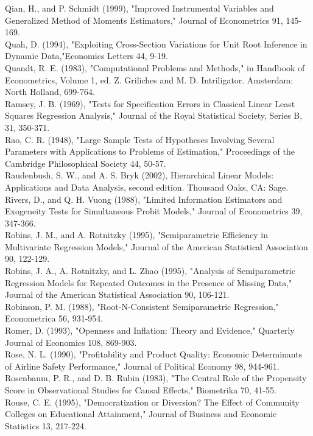\documentclass[10pt]{article}
\begin{document}
Qian, H., and P. Schmidt (1999), "Improved Instrumental Variables and Generalized Method of Moments Estimators," Journal of Econometrics 91, 145-169.\\
Quah, D. (1994), "Exploiting Cross-Section Variations for Unit Root Inference in Dynamic Data,"Economics Letters 44, 9-19.\\
Quandt, R. E. (1983), "Computational Problems and Methods," in Handbook of Econometrics, Volume 1, ed. Z. Griliches and M. D. Intriligator. Amsterdam: North Holland, 699-764.\\
Ramsey, J. B. (1969), "Tests for Specification Errors in Classical Linear Least Squares Regression Analysis," Journal of the Royal Statistical Society, Series B, 31, 350-371.\\
Rao, C. R. (1948), "Large Sample Tests of Hypotheses Involving Several Parameters with Applications to Problems of Estimation," Proceedings of the Cambridge Philosophical Society 44, 50-57.\\
Raudenbush, S. W., and A. S. Bryk (2002), Hierarchical Linear Models: Applications and Data Analysis, second edition. Thousand Oaks, CA: Sage.\\
Rivers, D., and Q. H. Vuong (1988), "Limited Information Estimators and Exogeneity Tests for Simultaneous Probit Models," Journal of Econometrics 39, 347-366.\\
Robins, J. M., and A. Rotnitzky (1995), "Semiparametric Efficiency in Multivariate Regression Models," Journal of the American Statistical Association 90, 122-129.\\
Robins, J. A., A. Rotnitzky, and L. Zhao (1995), "Analysis of Semiparametric Regression Models for Repeated Outcomes in the Presence of Missing Data," Journal of the American Statistical Association 90, 106-121.\\
Robinson, P. M. (1988), "Root-N-Consistent Semiparametric Regression," Econometrica 56, 931-954.\\
Romer, D. (1993), "Openness and Inflation: Theory and Evidence," Quarterly Journal of Economics 108, 869-903.\\
Rose, N. L. (1990), "Profitability and Product Quality: Economic Determinants of Airline Safety Performance," Journal of Political Economy 98, 944-961.\\
Rosenbaum, P. R., and D. B. Rubin (1983), "The Central Role of the Propensity Score in Observational Studies for Causal Effects," Biometrika 70, 41-55.\\
Rouse, C. E. (1995), "Democratization or Diversion? The Effect of Community Colleges on Educational Attainment," Journal of Business and Economic Statistics 13, 217-224.\\
\end{document}

